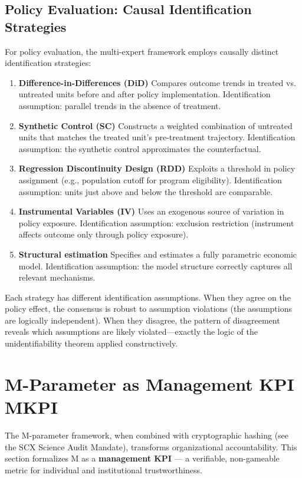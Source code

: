 \documentclass[11pt,a4paper]{article}
\theoremstyle{definition}
\begin{document}
\subsection{Policy Evaluation: Causal Identification Strategies}
For policy evaluation, the multi-expert framework employs causally distinct identification strategies:
\begin{enumerate}[label=(\textbf{\arabic*}),leftmargin=*]
    \item \textbf{Difference-in-Differences (DiD)} Compares outcome trends in treated vs. untreated units before and after policy implementation. Identification assumption: parallel trends in the absence of treatment.
    \item \textbf{Synthetic Control (SC)} Constructs a weighted combination of untreated units that matches the treated unit's pre-treatment trajectory. Identification assumption: the synthetic control approximates the counterfactual.
    \item \textbf{Regression Discontinuity Design (RDD)} Exploits a threshold in policy assignment (e.g., population cutoff for program eligibility). Identification assumption: units just above and below the threshold are comparable.
    \item \textbf{Instrumental Variables (IV)} Uses an exogenous source of variation in policy exposure. Identification assumption: exclusion restriction (instrument affects outcome only through policy exposure).
    \item \textbf{Structural estimation} Specifies and estimates a fully parametric economic model. Identification assumption: the model structure correctly captures all relevant mechanisms.
\end{enumerate}
Each strategy has different identification assumptions. When they agree on the policy effect, the consensus is robust to assumption violations (the assumptions are logically independent). When they disagree, the pattern of disagreement reveals which assumptions are likely violated---exactly the logic of the unidentifiability theorem applied constructively.
\section{M-Parameter as Management KPI MKPI}
\label{sec:m-kpi}
The M-parameter framework, when combined with cryptographic hashing (see the SCX Science Audit Mandate), transforms organizational accountability. This section formalizes M as a \textbf{management KPI} — a verifiable, non-gameable metric for individual and institutional trustworthiness.
\end{document}

